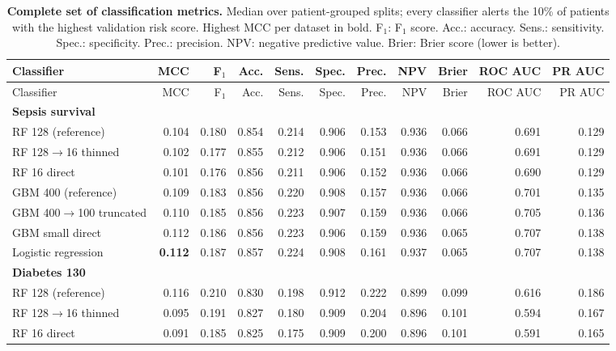 {\scriptsize\setlength{\tabcolsep}{3pt}
\begin{longtable}{lrrrrrrrrrr}
\caption{\textbf{Complete set of classification metrics.} Median over patient-grouped splits; every classifier alerts the 10\% of patients with the highest validation risk score. Highest MCC per dataset in bold. F$_1$: F$_1$ score. Acc.: accuracy. Sens.: sensitivity. Spec.: specificity. Prec.: precision. NPV: negative predictive value. Brier: Brier score (lower is better).}\label{tab:METRIC-SUITE}\\
\toprule
Classifier & MCC & F$_1$ & Acc. & Sens. & Spec. & Prec. & NPV & Brier & ROC AUC & PR AUC \\
\midrule
\endfirsthead
\toprule
Classifier & MCC & F$_1$ & Acc. & Sens. & Spec. & Prec. & NPV & Brier & ROC AUC & PR AUC \\
\midrule
\endhead
\multicolumn{11}{l}{\textbf{Sepsis survival}} \\*
\quad RF 128 (reference) & 0.104 & 0.180 & 0.854 & 0.214 & 0.906 & 0.153 & 0.936 & 0.066 & 0.691 & 0.129 \\
\quad RF 128$\rightarrow$16 thinned & 0.102 & 0.177 & 0.855 & 0.212 & 0.906 & 0.151 & 0.936 & 0.066 & 0.691 & 0.129 \\
\quad RF 16 direct & 0.101 & 0.176 & 0.856 & 0.211 & 0.906 & 0.152 & 0.936 & 0.066 & 0.690 & 0.129 \\
\quad GBM 400 (reference) & 0.109 & 0.183 & 0.856 & 0.220 & 0.908 & 0.157 & 0.936 & 0.066 & 0.701 & 0.135 \\
\quad GBM 400$\rightarrow$100 truncated & 0.110 & 0.185 & 0.856 & 0.223 & 0.907 & 0.159 & 0.936 & 0.066 & 0.705 & 0.136 \\
\quad GBM small direct & 0.112 & 0.186 & 0.856 & 0.223 & 0.906 & 0.159 & 0.936 & 0.065 & 0.707 & 0.138 \\
\quad Logistic regression & \textbf{0.112} & 0.187 & 0.857 & 0.224 & 0.908 & 0.161 & 0.937 & 0.065 & 0.707 & 0.138 \\
\midrule
\multicolumn{11}{l}{\textbf{Diabetes 130}} \\*
\quad RF 128 (reference) & 0.116 & 0.210 & 0.830 & 0.198 & 0.912 & 0.222 & 0.899 & 0.099 & 0.616 & 0.186 \\
\quad RF 128$\rightarrow$16 thinned & 0.095 & 0.191 & 0.827 & 0.180 & 0.909 & 0.204 & 0.896 & 0.101 & 0.594 & 0.167 \\
\quad RF 16 direct & 0.091 & 0.185 & 0.825 & 0.175 & 0.909 & 0.200 & 0.896 & 0.101 & 0.591 & 0.165 \\

\end{longtable}}
